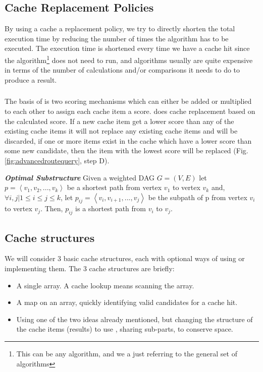 \subsection{Cache Replacement Policies}

By using a cache a replacement policy, we try to directly shorten the total execution time by reducing the number of times the \spath algorithm has to be executed. 
The execution time is shortened every time we have a cache hit since the \spath algorithm\footnote{This can be any \spath algorithm, and we a just referring to the general set of \spath algorithms} does not need to run, and \spath algorithms usually are quite expensive in terms of the number of calculations and/or comparisons it needs to do to produce a result.


\subsubsection{\osc}

The basis of \osc is two scoring mechanisms which can either be added or multiplied to each other to assign each cache item a score. \osc does cache replacement based on the calculated score. If a new cache item get a lower score than any of the existing cache items it will not replace any existing cache items and will be discarded, if one or more items exist in the cache which have a lower score than some new candidate, then the item with the lowest score will be replaced (Fig. \ref{fig:advancedroutequery}, step D).

\begin{lemma}{\it \textbf{\spath Optimal Substructure}}
Given a weighted DAG $G = (V, E)$ let $p = \left< v_1, v_2,..., v_k \right>$ be a shortest path from vertex $v_1$ to vertex $v_k$ and, $\forall i,j | 1 \leq i \leq j \leq k$, let $p_{ij} = \left<v_i, v_{i+1},..., v_j \right>$ be the subpath of p from vertex $v_i$ to vertex $v_j$. Then, $p_{ij}$ is a shortest path from $v_i$ to $v_j$.
\end{lemma}



\subsection{Cache structures}

We will consider 3 basic cache structures, each with optional ways of using or implementing them. The 3 cache structures are briefly:
\begin{itemize}
\item A single array. A cache lookup means scanning the array.
\item A map on an array, quickly identifying valid candidates for a cache hit.
\item Using one of the two ideas already mentioned, but changing the structure of the cache items (\spath results) to use \spsns, sharing sub-parts, to conserve space.
\end{itemize}

